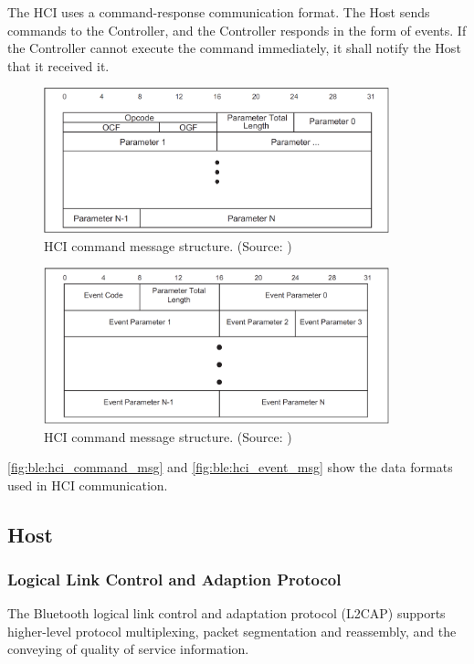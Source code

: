The HCI uses a command-response communication format.
The Host sends commands to the Controller, and the Controller responds in the form of events.
If the Controller cannot execute the command immediately, it shall notify the Host that it received it.

\begin{figure}[!ht]
    \centering
    \includegraphics[width=100mm, keepaspectratio]{figures/hci_command_msg.png}
    \caption{HCI command message structure. (Source: \cite{bt5})}
    \label{fig:ble:hci_command_msg}
\end{figure}

\begin{figure}[!ht]
    \centering
    \includegraphics[width=100mm, keepaspectratio]{figures/hci_event_msg.png}
    \caption{HCI command message structure. (Source: \cite{bt5})}
    \label{fig:ble:hci_event_msg}
\end{figure}

\autoref{fig:ble:hci_command_msg} and \autoref{fig:ble:hci_event_msg} show the data formats used in HCI communication.

\subsection{Host}
\label{ble:host}
\subsubsection{Logical Link Control and Adaption Protocol}
\label{ble:host:l2cap}
The Bluetooth logical link control and adaptation protocol (L2CAP)
supports higher-level protocol multiplexing, packet segmentation and
reassembly, and the conveying of quality of service information. 

